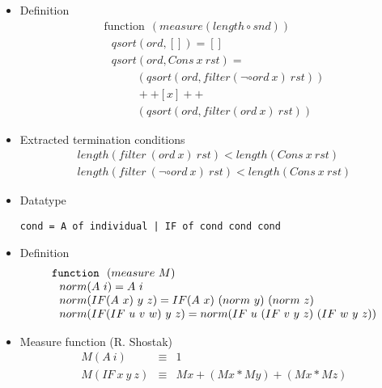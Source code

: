 \begin{slide}
\begin{itemize}
\item Definition
\[
\begin{array}{l}
\mbox{function}\ \ (measure(length\circ snd)) \\
{~~~} qsort (ord,[]) = []  \\
{~~~} qsort (ord,Cons\ x\ rst) = \\
{~~~~~~~~~~~~~}    (qsort (ord,filter(\neg \circ ord\ x)\ rst)) \\
{~~~~~~~~~~~~~}    ++ [x] ++ \\
{~~~~~~~~~~~~~}    (qsort (ord,filter(ord\ x)\ rst))
\end{array}
\]


\item Extracted termination conditions
\[
\begin{array}{l}
length(filter\ (ord\ x)\ rst) < length(Cons\ x\ rst) \\
length(filter\ (\neg \circ ord\ x)\ rst) < length(Cons\ x\ rst)
\end{array}
\]
\end{itemize}
\end{slide}


\begin{slide}

\begin{itemize}
\item Datatype
\begin{verbatim}
cond = A of individual | IF of cond cond cond
\end{verbatim}

\item Definition 
\[
\begin{array}{l}
\mbox{\tt function}\ \ (measure\ M) \\
{~~} norm(A\ i)  =  A\ i \\
{~~} norm(IF(A\  x)\ y\ z)  =  IF (A\  x)\ (norm\ y)\ (norm\ z) \\
{~~} norm(IF(IF\ u\ v\ w)\ y\ z) =  norm(IF\ u\ (IF\ v\ y\ z)\ (IF\
w\ y\ z))
\end{array}
\]

\item Measure function (R. Shostak)
\begin{eqnarray*}
  M (A\ i) & \equiv & 1 \\
  M (IF\ x\ y\ z) & \equiv & M x + (M x \ast M y) + (M x \ast M z)
\end{eqnarray*}

\end{itemize}
\end{slide}

